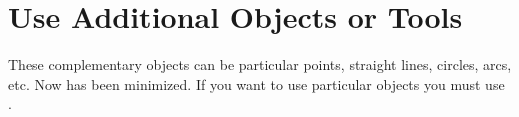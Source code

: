 \section{Use Additional Objects or Tools}


These complementary objects can be particular points, straight lines, circles, arcs, etc.
Now \tkzname{\tkznameofpack} has been minimized. If you want to use particular objects you must use .

\endinput